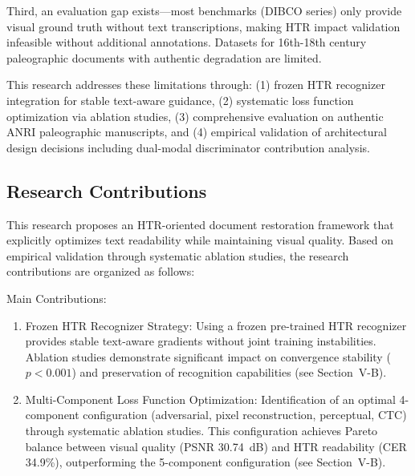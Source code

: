 \documentclass[journal]{IEEEtran}
\begin{document}
Third, an evaluation gap exists—most benchmarks (DIBCO series) only provide visual ground truth without text transcriptions, making HTR impact validation infeasible without additional annotations. Datasets for 16th-18th century paleographic documents with authentic degradation are limited.

This research addresses these limitations through: (1) frozen HTR recognizer integration for stable text-aware guidance, (2) systematic loss function optimization via ablation studies, (3) comprehensive evaluation on authentic ANRI paleographic manuscripts, and (4) empirical validation of architectural design decisions including dual-modal discriminator contribution analysis.

\subsection{Research Contributions}

This research proposes an HTR-oriented document restoration framework that explicitly optimizes text readability while maintaining visual quality. Based on empirical validation through systematic ablation studies, the research contributions are organized as follows:

Main Contributions:
\begin{enumerate}
    \item Frozen HTR Recognizer Strategy: Using a frozen pre-trained HTR recognizer provides stable text-aware gradients without joint training instabilities. Ablation studies demonstrate significant impact on convergence stability ($p<0.001$) and preservation of recognition capabilities (see Section~V-B).
    
    \item Multi-Component Loss Function Optimization: Identification of an optimal 4-component configuration (adversarial, pixel reconstruction, perceptual, CTC) through systematic ablation studies. This configuration achieves Pareto balance between visual quality (PSNR 30.74~dB) and HTR readability (CER 34.9\%), outperforming the 5-component configuration (see Section~V-B).
\end{enumerate}
\end{document}
